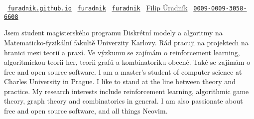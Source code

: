\begin{center}
	\small
	\hspace{.5in}
	\faGlobe\ \texttt{\href{https://furadnik.github.io}{furadnik.github.io}}
	\hfill
	\faGithub\ \texttt{\href{https://github.com/furadnik}{furadnik}}                                                                      
	\hfill
	\faLinkedin\ \texttt{\href{https://www.linkedin.com/in/furadnik/}{furadnik}}
	\hfill
	\aiGoogleScholarSquare\ \href{https://scholar.google.com/citations?user=7AvTiqgAAAAJ}{Filip Úradník}
	\hfill
	\aiOrcid\ \texttt{\href{https://orcid.org/0009-0009-3058-6608}{0009-0009-3058-6608}}
	\hspace{.5in}

\end{center}

\begin{intro}
	\lng
	{
		Jsem student magisterského programu Diskrétní modely a algoritmy na Matematicko-fyzikální fakultě Univerzity Karlovy.
		Rád pracuji na projektech na hranici mezi teorií a praxí.
		Ve výzkumu se zajímám o reinforcement learning, algoritmickou teorii her, teorii grafů a kombinatoriku obecně.
		Také se zajímám o free and open source software.
	}{
		I am a master's student of computer science at Charles University in Prague.
		I like to stand at the line between theory and practice.
		My research interests include reinforcement learning, algorithmic game theory, graph theory and combinatorics in general.
		I am also passionate about free and open source software, and all things Neovim.
	}
\end{intro}


